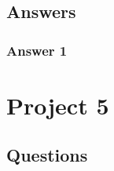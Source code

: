 \documentclass[a4paper, 12pt, english]{article}
\begin{document}
    \subsection{Answers}

    \subsubsection{Answer 1}

    \newpage


    \section{Project 5}

    \subsection{Questions}
\end{document}
